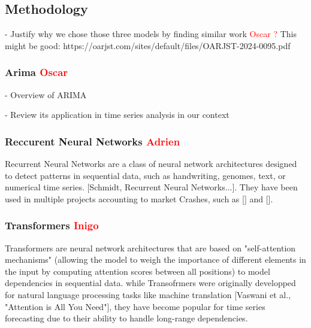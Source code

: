 \documentclass[12pt, letterpaper]{article}
\begin{document}






\subsection*{Methodology}
- Justify why we chose those three models by finding similar work \textcolor{red}{Oscar ?} This might be good: https://oarjst.com/sites/default/files/OARJST-2024-0095.pdf
    \subsubsection*{Arima \textcolor{red}{Oscar}}
    - Overview of ARIMA 

    - Review its application in time series analysis in our context
    \subsubsection*{Reccurent Neural Networks \textcolor{red}{Adrien}}
    Recurrent Neural Networks are a class of neural network architectures designed to detect patterns in sequential data, such as handwriting, genomes, text, or numerical time series. [Schmidt, Recurrent Neural Networks...]. They have been used in multiple projects accounting to market Crashes, such as [] and [].

    \subsubsection*{Transformers \textcolor{red}{Inigo}}
Transformers are neural network architectures that are based on "self-attention mechanisms" (allowing the model to weigh the importance of different elements in the input by computing attention scores between all positions) to model dependencies in sequential data. while Transofrmers were originally developped for natural language processing tasks like machine translation [Vaswani et al., "Attention is All You Need"], they have become popular for time series forecasting due to their ability to handle long-range dependencies.
\end{document}
